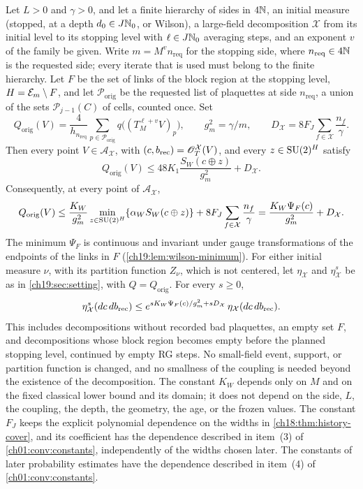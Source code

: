 \begin{lemma}
Let $L>0$ and $\gamma>0$, and let a finite hierarchy of sides in $4\mathbb N$, an initial measure (stopped, at a depth $d_0\in J\mathbb N_0$, or Wilson), a large-field decomposition $\mathcal X$ from its initial level to its stopping level with $\ell\in J\mathbb N_0$ averaging steps, and an exponent $v$ of the family be given. Write $m=M^vn_{\mathrm{req}}$ for the stopping side, where $n_{\mathrm{req}}\in4\mathbb N$ is the requested side; every iterate that is used must belong to the finite hierarchy. Let $F$ be the set of links of the block region at the stopping level, $H=\mathcal E_{m}\setminus F$, and let $\mathcal P_{\mathrm{orig}}$ be the requested list of plaquettes at side $n_{\mathrm{req}}$, a union of the sets $\mathcal P_{j-1}(C)$ of cells, counted once. Set
\[
 Q_{\mathrm{orig}}(V)=\frac4{h_{n_{\mathrm{req}}}}\sum_{p\in\mathcal P_{\mathrm{orig}}}q\bigl((T_M^{\ell+v}V)_p\bigr),\qquad
 g_m^2=\gamma/m,\qquad
 D_{\mathcal X}=8F_J\sum_{f\in\mathcal X}\frac{n_f}\gamma.
\]
Then every point $V\in\mathcal A_{\mathcal X}$, with $(c,b_{\mathrm{rec}})=\mathscr O_T^{\mathcal X}(V)$, and every $z\in\mathrm{SU}(2)^H$ satisfy
\begin{equation}\label{ch19:eq:arbitrary-completion-source-cap}
 Q_{\mathrm{orig}}(V)\le48K_1\frac{S_W(c\oplus z)}{g_m^2}+D_{\mathcal X}.
\end{equation}
Consequently, at every point of $\mathcal A_{\mathcal X}$,
\begin{equation}\label{ch19:eq:compact-wilson-source-cap}
 Q_{\mathrm{orig}}(V)\le\frac{K_W}{g_m^2}\min_{z\in\mathrm{SU}(2)^H}\{\alpha_WS_W(c\oplus z)\}+8F_J\sum_{f\in\mathcal X}\frac{n_f}\gamma
 =\frac{K_W\Psi_F(c)}{g_m^2}+D_{\mathcal X}.
\end{equation}
The minimum $\Psi_F$ is continuous and invariant under gauge transformations of the endpoints of the links in $F$ (\cref{ch19:lem:wilson-minimum}). For either initial measure $\nu$, with its partition function $Z_\nu$, which is not centered, let $\eta_{\mathcal X}$ and $\eta_{\mathcal X}^s$ be as in \cref{ch19:sec:setting}, with $Q=Q_{\mathrm{orig}}$. For every $s\ge0$,
\begin{equation}\label{ch19:eq:source-cap-pushforward}
 \eta_{\mathcal X}^s(dc\,db_{\mathrm{rec}})\le e^{sK_W\Psi_F(c)/g_m^2+sD_{\mathcal X}}\,\eta_{\mathcal X}(dc\,db_{\mathrm{rec}}).
\end{equation}
This includes decompositions without recorded bad plaquettes, an empty set $F$, and decompositions whose block region becomes empty before the planned stopping level, continued by empty RG steps. No small-field event, support, or partition function is changed, and no smallness of the coupling is needed beyond the existence of the decomposition. The constant $K_W$ depends only on $M$ and on the fixed classical lower bound and its domain; it does not depend on the side, $L$, the coupling, the depth, the geometry, the age, or the frozen values. The constant $F_J$ keeps the explicit polynomial dependence on the widths in \cref{ch18:thm:history-cover}, and its coefficient has the dependence described in item~(3) of \cref{ch01:conv:constants}, independently of the widths chosen later. The constants of later probability estimates have the dependence described in item~(4) of \cref{ch01:conv:constants}.
\end{lemma}

